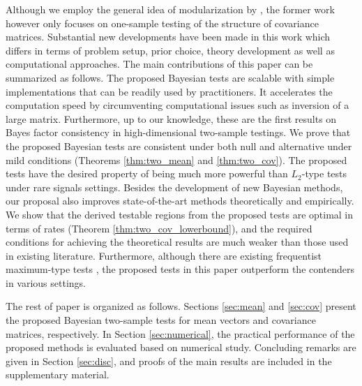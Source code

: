 \documentclass[11pt]{article}
\begin{document}
Although we employ the general idea of modularization by \cite{lee2018maximum}, the former work however only focuses on one-sample testing of the structure of covariance matrices.     
Substantial new developments have been made in this work which differs in terms of problem setup, prior choice, theory development as well as computational approaches.
The main contributions of this paper can be summarized as follows.
The proposed Bayesian tests are scalable with simple implementations that can be readily used by practitioners.
It accelerates the computation speed by circumventing computational issues such as inversion of a large matrix.
Furthermore, up to our knowledge, these are the first results on Bayes factor consistency in high-dimensional two-sample testings.
We prove that the proposed Bayesian tests are consistent under both null and alternative under mild conditions (Theorems \ref{thm:two_mean} and \ref{thm:two_cov}).
The proposed tests have the desired property of being  much more powerful than $L_2$-type tests under rare signals settings.
Besides the development of new Bayesian methods, our proposal also improves state-of-the-art methods theoretically and empirically. We show that the derived testable regions from the proposed tests are optimal in terms of rates (Theorem \ref{thm:two_cov_lowerbound}), and the required conditions for achieving the theoretical results are much weaker than those used in existing literature.
Furthermore, although there are existing frequentist maximum-type tests \citep{cai2014two,cai2013two}, the proposed tests in this paper  outperform the contenders in various settings.

The rest of paper is organized as follows.
Sections \ref{sec:mean} and \ref{sec:cov} present the proposed Bayesian two-sample tests for mean vectors and covariance matrices, respectively.
In Section \ref{sec:numerical}, the practical performance of the proposed methods is evaluated based on numerical study.
Concluding remarks are given in Section \ref{sec:disc}, and proofs of the main results are included in the supplementary material.
\end{document}
